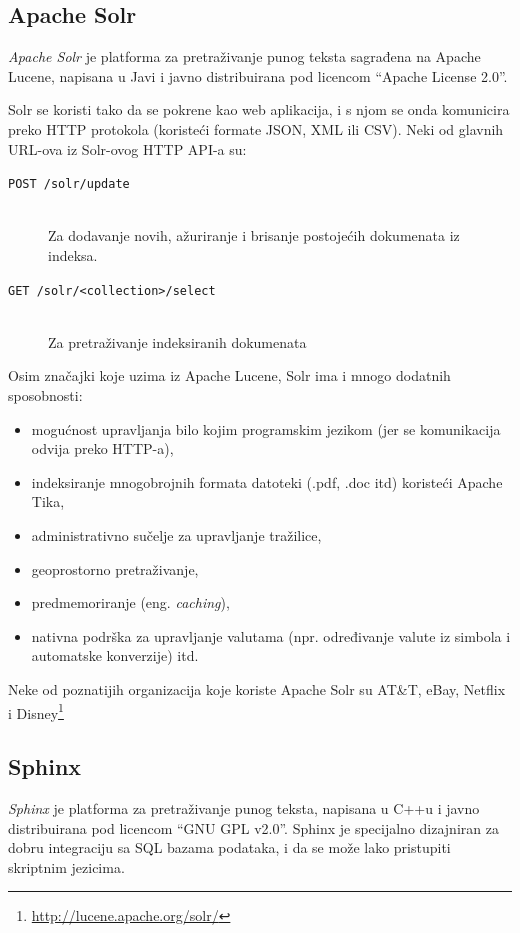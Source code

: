 \documentclass[a4paper,twoside,12pt]{scrreprt}
\begin{document}
\subsection{Apache Solr}

\textit{Apache Solr} je platforma za pretraživanje punog teksta sagrađena na Apache Lucene, napisana u Javi i javno distribuirana pod licencom ``Apache License 2.0''.

Solr se koristi tako da se pokrene kao web aplikacija, i s njom se onda komunicira preko HTTP protokola (koristeći formate JSON, XML ili CSV). Neki od glavnih URL-ova iz Solr-ovog HTTP API-a su:

\begin{description}
  \item[\texttt{POST /solr/update}] \hfill \\ Za dodavanje novih, ažuriranje i brisanje postojećih dokumenata iz indeksa.
  \item[\texttt{GET /solr/<collection>/select}] \hfill \\ Za pretraživanje indeksiranih dokumenata
\end{description}

Osim značajki koje uzima iz Apache Lucene, Solr ima i mnogo dodatnih sposobnosti:

\begin{itemize}
  \item mogućnost upravljanja bilo kojim programskim jezikom (jer se komunikacija odvija preko HTTP-a),
  \item indeksiranje mnogobrojnih formata datoteki (.pdf, .doc itd) koristeći Apache Tika,
  \item administrativno sučelje za upravljanje tražilice,
  \item geoprostorno pretraživanje,
  \item predmemoriranje (eng. \textit{caching}),
  \item nativna podrška za upravljanje valutama (npr. određivanje valute iz simbola i automatske konverzije) itd.
\end{itemize}

Neke od poznatijih organizacija koje koriste Apache Solr su AT\&T, eBay, Netflix i Disney\footnote{\url{http://lucene.apache.org/solr/}}

\subsection{Sphinx}

\textit{Sphinx} je platforma za pretraživanje punog teksta, napisana u C++u i javno distribuirana pod licencom ``GNU GPL v2.0''. Sphinx je specijalno dizajniran za dobru integraciju sa SQL bazama podataka, i da se može lako pristupiti skriptnim jezicima.
\end{document}
